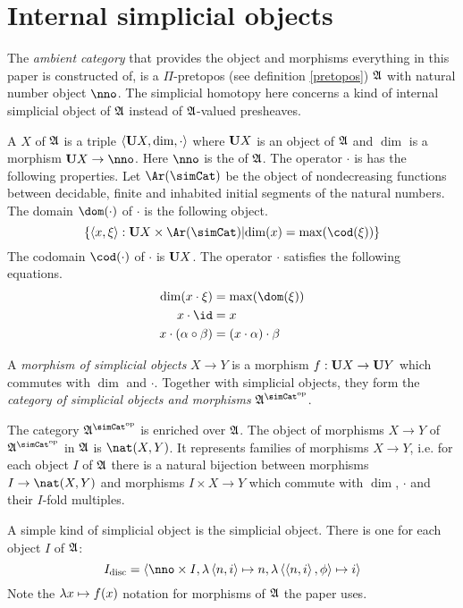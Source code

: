 \documentclass[csh.tex]{subfiles}
\begin{document}
\section{Internal simplicial objects}
The \emph{ambient category} that provides the object and morphisms everything in this paper is constructed of, is a $\Pi$-pretopos (see definition \ref{pretopos}) $\mathfrak A$ with natural number object $\nno$. The simplicial homotopy here concerns a kind of internal simplicial object of $\mathfrak A$ instead of $\mathfrak A$-valued presheaves.

\begin{definition} A  $X$ of $\mathfrak A$ is a triple $\left\langle \mathbf{U} X, \dim, \cdot \right\rangle$ where $\mathbf{U} X$ is an object of $\mathfrak A$ and $\dim$ is a morphism $\base X\to \nno$. Here $\nno$ is the  of $\mathfrak A$. The operator $\cdot$ is has the following properties. Let $\Ar(\simCat)$ be the object of nondecreasing functions between decidable, finite and inhabited initial segments of the natural numbers. The domain $\dom(\cdot)$ of $\cdot$ is the following object. 
\[ \set{\tuplet{x,\xi}\of \base X\times \Ar(\simCat)\middle| \dim(x) = \max(\cod(\xi))}\]
The codomain $\cod(\cdot)$ of $\cdot$ is $\mathbf{U} X$. The operator $\cdot$ satisfies the following equations.
\begin{align*}
\dim(x\cdot\xi) &= \max(\dom(\xi))\\
x\cdot \id &= x \\
x\cdot(\alpha\circ\beta)&=(x\cdot\alpha)\cdot\beta 
\end{align*}

A \emph{morphism of simplicial objects} $X\to Y$ is a morphism $f:\mathbf{U} X\to\mathbf{U} Y$ which commutes with $\dim$ and $\cdot$. Together with simplicial objects, they form the \emph{category of simplicial objects and morphisms} $\ambient\s$.

The category $\ambient\s$ is enriched over $\mathfrak A$. The object of morphisms $X\to Y$ of $\ambient\s$ in $\mathfrak A$ is $\nat(X,Y)$. It represents families of morphisms $X\to Y$, i.e. for each object $I$ of $\mathfrak A$ there is a natural bijection between morphisms $I\to \nat(X,Y)$ and morphisms $I\times X\to Y$ which commute with $\dim$, $\cdot$ and their $I$-fold multiples.
\end{definition}

\begin{example} A simple kind of simplicial object is the  simplicial object. There is one for each object $I$ of $\mathfrak A$: 
\[ I\disc = \tuplet{\nno\times I,\function{\tuplet{n,i}}n,\function{\tuplet{\tuplet{n,i},\phi}}i} \]
Note the $\lambda x \mapsto{f(x)}$ notation for morphisms of $\mathfrak A$ the paper uses.
\end{example}
\end{document}
